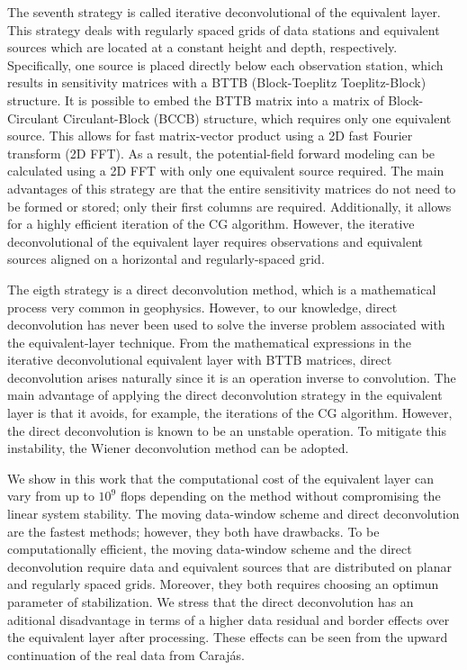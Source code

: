 The seventh strategy is called iterative deconvolutional of the equivalent layer.
This strategy deals with regularly spaced grids of data stations and equivalent sources which are located at a constant height and depth, respectively. 
Specifically, one source is placed directly below each observation station, which results in sensitivity matrices with a BTTB (Block-Toeplitz Toeplitz-Block) structure. 
It is possible to embed the BTTB matrix into a matrix of Block-Circulant Circulant-Block (BCCB) structure, which requires only one equivalent source. 
This allows for fast matrix-vector product using a 2D fast Fourier transform (2D FFT). 
As a result, the potential-field forward modeling can be calculated using 
a 2D FFT with only one equivalent source required. 
The main advantages of this strategy are that the entire sensitivity matrices do not need to be formed or stored; only their first columns are required. Additionally, it allows for a highly efficient iteration of the CG algorithm.
However, the iterative deconvolutional of the equivalent layer requires 
observations and equivalent sources aligned on a horizontal and regularly-spaced grid.

The eigth strategy is a direct deconvolution method, which is a mathematical process very common in geophysics. 
However, to our knowledge, direct deconvolution has never been used to solve the inverse problem associated with the equivalent-layer technique. 
From the mathematical expressions in the iterative deconvolutional equivalent layer with BTTB matrices, direct deconvolution arises naturally since it is an operation inverse to convolution. 
The main advantage of applying the direct deconvolution strategy in the equivalent layer is that it avoids, for example, the  iterations of the CG algorithm. 
However, the direct deconvolution is known to be an unstable operation.
To mitigate this instability, the Wiener deconvolution method can be adopted.


We show in this work that the computational cost of the equivalent layer can vary from up to $10^{9}$ flops depending on the method without compromising the linear system stability. 
The moving data-window scheme and direct deconvolution are the fastest methods; however, they both have drawbacks.
To be computationally efficient, the moving data-window scheme and 
the direct deconvolution require data and equivalent sources that are distributed on planar and regularly spaced grids.
Moreover, they both requires choosing an optimun parameter of stabilization. 
We stress that the direct deconvolution has an aditional disadvantage in terms of a higher data residual and border effects over the equivalent layer after processing.
These effects can be seen from the upward continuation of the real data from Carajás.




